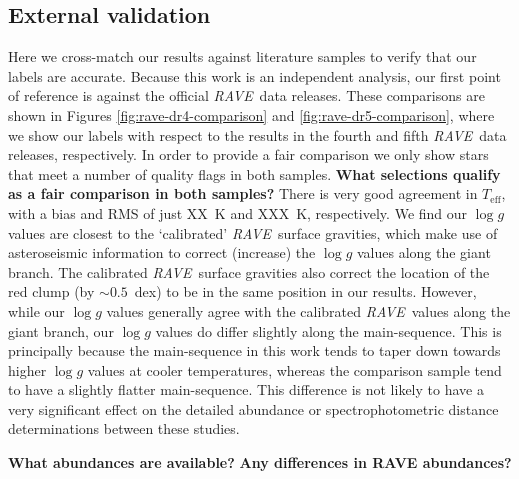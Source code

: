 \documentclass[preprint,trackchanges]{aastex}
\newcommand{\project}[1]{\textsl{#1}}
\newcommand{\acronym}[1]{{\small{#1}}}
\newcommand{\rave}{\project{\acronym{RAVE}}}
\newcommand{\logg}{\log g}
\newcommand{\teff}{T_{\mathrm{eff}}}
\newcommand{\stub}[1]{\textbf{#1}}
\begin{document}


\subsection{External validation}
\label{sec:external-validation}

Here we cross-match our results against literature samples to verify that
our labels are accurate.  Because this work is an independent analysis, our
first point of reference is against the official \rave\ data releases.  These
comparisons are shown in Figures \ref{fig:rave-dr4-comparison} and 
\ref{fig:rave-dr5-comparison}, where we show our labels with respect to the
results in the fourth and fifth \rave\ data releases, respectively.  In order
to provide a fair comparison we only show stars that meet a number of quality
flags in both samples. 
\stub{What selections qualify as a fair comparison in both samples?}
There is very good agreement in $\teff$, with a bias
and RMS of just XX~K and XXX~K, respectively.  We find our $\logg$ values are
closest to the `calibrated' \rave\ surface gravities, which make use of 
asteroseismic information to correct (increase) the $\logg$ values along the
giant branch.  The calibrated \rave\ surface gravities also correct the 
location of the red clump (by $\sim0.5$~dex) to be in the same position in our
results.  However, while our $\logg$ values generally agree with the calibrated
\rave\ values along the giant branch, our $\logg$ values do differ slightly 
along the main-sequence.  This is principally because the main-sequence in 
this work tends to taper down towards higher $\logg$ values at cooler 
temperatures, whereas the comparison sample tend to have a slightly flatter
main-sequence.  This difference is not likely to have a very significant 
effect on the detailed abundance or spectrophotometric distance determinations
between these studies.

\stub{What abundances are available?}
\stub{Any differences in RAVE abundances?}


\end{document}
